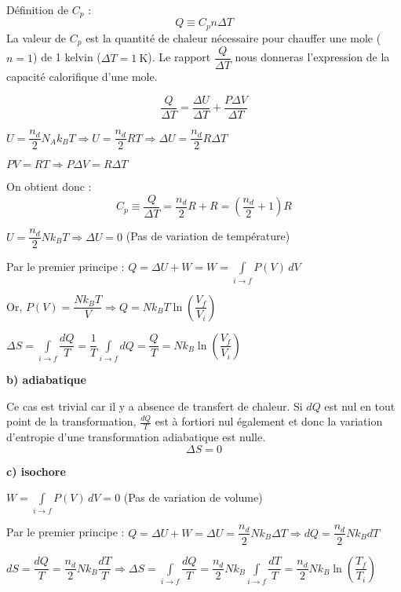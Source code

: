 \documentclass[british,french,11pt, a4paper, openany]{book}
\begin{document}
		Définition de $C_p$ : $$Q \equiv C_p n \Delta T$$ La valeur de $C_p$ est la quantité de chaleur nécessaire pour chauffer une mole ($n=1$) de 1 kelvin ($\Delta T = 1\ \text{K}$). Le rapport $\dfrac{Q}{\Delta T}$ nous donneras l'expression de la capacité calorifique d'une mole.
			
		$$ \frac{Q}{\Delta T} = \frac{\Delta U}{\Delta T} + \frac{P\Delta V}{\Delta T}$$
			
		$U = \dfrac{n_d}{2}N_Ak_BT \Rightarrow U = \dfrac{n_d}{2}RT \Rightarrow \Delta U = \dfrac{n_d}{2}R\Delta T$
			
		$ PV = RT \Rightarrow P \Delta V = R \Delta T$
			
		On obtient donc : $$ C_p \equiv \frac{Q}{\Delta T} = \frac{n_d}{2}R + R = (\frac{n_d}{2}+1) R$$
		
		\vspace{0,5cm}
		
			
		$ U = \dfrac{n_d}{2}Nk_BT \Rightarrow \Delta U = 0$ (Pas de variation de température)
				
		Par le premier principe : $ Q = \Delta U + W = W = \int  \limits_{i \to f} P(V)\,dV$
				
		Or, $ P(V) = \dfrac{Nk_BT}{V} \Rightarrow Q = Nk_BT\ln \left(\dfrac{V_f}{V_i}\right)$
				
		$ \Delta S = \int \limits_{i \to f} \dfrac{dQ}{T} = \dfrac{1}{T} \int \limits_{i \to f} dQ = \dfrac{Q}{T} = Nk_B\ln \left(\dfrac{V_f}{V_i}\right)$
			
		\textbf{b) adiabatique}
				
		Ce cas est trivial car il y a absence de transfert de chaleur. Si $dQ$ est nul en tout point de la transformation, $\frac{dQ}{T}$ est à fortiori nul également et donc la variation d'entropie d'une transformation adiabatique est nulle. $$\Delta S = 0$$
				
		\textbf{c) isochore}
			
		$W = \int  \limits_{i \to f} P(V)\,dV = 0$ (Pas de variation de volume)
				
		Par le premier principe : $ Q = \Delta U + W = \Delta U = \dfrac{n_d}{2}Nk_B\Delta T \Rightarrow dQ = \dfrac{n_d}{2}Nk_BdT $
				
		$ dS = \dfrac{dQ}{T} = \dfrac{n_d}{2}Nk_B\dfrac{dT}{T} \Rightarrow \Delta S = \int \limits_{i \to f} \dfrac{dQ}{T} = \dfrac{n_d}{2}Nk_B \int \limits_{i \to f} \dfrac{dT}{T} = \dfrac{n_d}{2}Nk_B\ln \left(\dfrac{T_f}{T_i}\right)$
				
\end{document}

